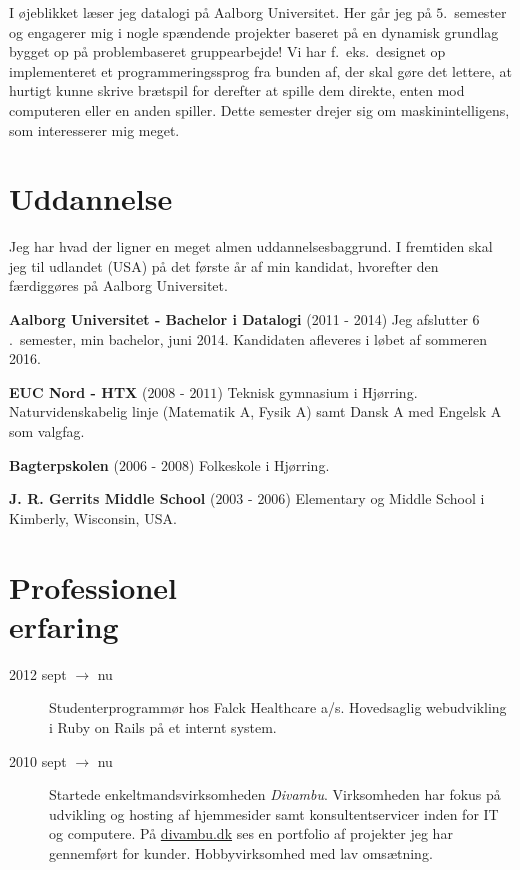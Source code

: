 \documentclass[margin,line,a4paper]{resume}
\begin{document}
\begin{resume}
    I øjeblikket læser jeg datalogi på Aalborg Universitet. Her går
    jeg på $5$.\ semester og engagerer mig i nogle spændende projekter
    baseret på en dynamisk grundlag bygget op på problembaseret
    gruppearbejde! Vi har f.\ eks.\ designet op implementeret et
    programmeringssprog fra bunden af, der skal gøre det lettere, at
    hurtigt kunne skrive brætspil for derefter at spille dem direkte,
    enten mod computeren eller en anden spiller. Dette semester drejer
    sig om maskinintelligens, som interesserer mig meget.

    \section{\mysidestyle Uddannelse}
    Jeg har hvad der ligner en meget almen uddannelsesbaggrund. I
    fremtiden skal jeg til udlandet (USA) på det første år af min
    kandidat, hvorefter den færdiggøres på Aalborg Universitet.

    \textbf{Aalborg Universitet - Bachelor i Datalogi}
      (2011 - 2014) Jeg afslutter $6$.\ semester, min bachelor, juni
      2014. Kandidaten afleveres i løbet af sommeren 2016.

    \textbf{EUC Nord - HTX} ($2008$ - $2011$) Teknisk gymnasium i Hjørring.
      Naturvidenskabelig linje (Matematik A, Fysik A) samt Dansk A med
      Engelsk A som valgfag.

    \textbf{Bagterpskolen} ($2006$ - $2008$) Folkeskole i Hjørring.

    \textbf{J. R. Gerrits Middle School} ($2003$ - $2006$) Elementary og
      Middle School i Kimberly, Wisconsin, USA.

\section{\mysidestyle Professionel\\erfaring}\vspace{1mm}
\begin{description}

  \item[2012 sept $\rightarrow$ nu] Studenterprogrammør hos Falck
    Healthcare a/s. Hovedsaglig webudvikling i Ruby on Rails på et internt
    system.

  \item[2010 sept $\rightarrow$ nu] Startede enkeltmandsvirksomheden
    \emph{Divambu}. Virksomheden har fokus på udvikling og hosting af
    hjemmesider samt konsultentservicer inden for IT og computere. På
    \url{divambu.dk} ses en portfolio af projekter jeg har gennemført for
    kunder. Hobbyvirksomhed med lav omsætning.


\end{description}
\end{resume}
\end{document}
